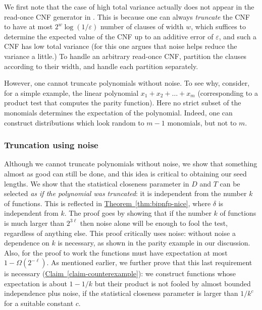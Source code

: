 \documentclass[11pt]{article}
\numberwithin{equation}{section}
\theoremstyle{definition}
\theoremstyle{plain}
\newcommand{\expref}[2]{\hyperref[#2]{#1~\ref{#2}}}
\def\eps{\varepsilon}
\def\Blocklength{\ell}
\begin{document}
We first note that the case of high total variance actually does not appear in the
read-once CNF generator in \cite{GopalanMRTV12}.
This is because one can always \emph{truncate} the CNF to have at most $2^w \log(1/\eps)$
number of clauses of width $w$, which suffices to
determine the expected value of the CNF up to an additive error of $\eps$,
and such a CNF has low total variance (for this one argues that noise
helps reduce the variance a little.) To handle an arbitrary read-once
CNF, \cite{GopalanMRTV12} partition the clauses according to their width,
and handle each partition separately.

However, one cannot truncate polynomials without noise.
To see why, consider, for a simple example, the linear polynomial $	x_1 + x_2 + \ldots + x_m$ (corresponding to a product test that computes the parity function).
Here no strict subset of the monomials determines the expectation of the polynomial.
Indeed, one can construct distributions which look random to $m-1$ monomials, but not to $m$.

\subsubsection{Truncation using noise}  %
%
Although we cannot truncate polynomials without noise, we show that something almost as good can still be done, and this idea is critical to obtaining our seed lengths.
We show that the statistical closeness parameter in $D$ and $T$
can be selected \emph{as if the polynomial was truncated}: it is
independent from the number $k$ of functions.
This is reflected in \expref{Theorem}{thm:bipnfp-nice}, where $\delta$ is independent from $k$.
The proof goes by showing that if the number $k$ of functions is much
larger than $2^{3\Blocklength}$ then noise alone will be enough to fool the test, regardless of
anything else.
This proof critically uses noise: without noise a dependence on $k$ is necessary, as shown in the parity example in our discussion.
Also, for the proof to work the functions must have expectation at most $1 - \Omega(2^{-\Blocklength})$.
As mentioned earlier, we further prove that this last requirement is necessary
(\expref{Claim}{claim-counterexample}): we construct functions whose
expectation is about $1 - 1/k$ but their product is not fooled by almost
bounded independence plus noise, if the statistical closeness parameter is
larger than $1/k^c$ for a suitable constant $c$.

%
\end{document}
